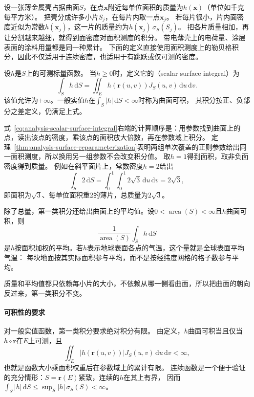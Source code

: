 设一张薄金属壳占据曲面$S$，在点$\bm x$附近每单位面积的质量为$h(\bm x)$（单位如千克每平方米）。
把壳分成许多小片$S_j$，在每片内取一点$\bm x_j$。
若每片很小，片内面密度近似为常数$h(\bm x_j)$，这一片的质量约为$h(\bm x_j)\,\sigma_S(S_j)$。
把各片质量相加，再让分割越来越细，就得到面密度对面积测度的积分。
带电薄壳上的电荷量、涂层表面的涂料用量都是同一种累计。
下面的定义直接使用面积测度上的勒贝格积分，因此不仅适用于连续密度，也适用于有跳跃或仅可测的密度。

\begin{definition}[第一类曲面积分]
\label{def:analysis-scalar-surface-integral}
设$h$是$S$上的可测标量函数。
当$h\geq0$时，定义它的（scalar surface integral）为
\begin{equation}
 \int_Sh\,\mathrm dS
 =\iint_Eh(\bm r(u,v))J_S(u,v)\,\mathrm du\,\mathrm dv.
 \label{eq:analysis-scalar-surface-integral}
\end{equation}
该值允许为$+\infty$。一般实值$h$在$\int_S|h|\,\mathrm dS<\infty$时称为曲面可积，
其积分按正、负部分之差定义，仍满足上式。
\end{definition}

式~\eqref{eq:analysis-scalar-surface-integral}右端的计算顺序是：用参数找到曲面上的点，读出该点的密度，乘该点的面积放大倍数，再在参数域上积分。
定理~\ref{thm:analysis-surface-reparameterization}表明两组单次覆盖的正则参数给出同一面积测度，所以换用另一组参数不会改变积分值。
取$h=1$得到面积，取非负面密度得到质量。
例如在斜平面片上，常数密度$h=2$给出
\[
 \int_S2\,\mathrm dS=\int_0^1\int_0^1 2\sqrt3\,\mathrm du\,\mathrm dv=2\sqrt3,
\]
即面积为$\sqrt3$、每单位面积重$2$的薄片，总质量为$2\sqrt3$。

除了总量，第一类积分还给出曲面上的平均值。设$0<\operatorname{area}(S)<\infty$且$h$曲面可积，则
\[
 \frac1{\operatorname{area}(S)}\int_Sh\,\mathrm dS
\]
是$h$按面积加权的平均。若$h$表示地球表面各点的气温，这个量就是全球表面平均气温：
每块地面按其实际面积参与平均，而不是按经纬度网格的格子数参与平均。

质量和平均值都只依赖每小片的大小，不依赖从哪一侧看曲面，所以把曲面的朝向反过来，第一类积分不变。

\paragraph{可积性的要求}

对一般实值函数，第一类积分要求绝对积分有限。
由定义，$h$曲面可积当且仅当$h\circ\bm r$在$E$上可测，且
\[
 \iint_E|h(\bm r(u,v))|J_S(u,v)\,\mathrm du\,\mathrm dv<\infty,
\]
也就是函数大小乘面积权重后在参数域上的累计有限。
连续函数是一个便于验证的充分情形：$S=\bm r(E)$紧致，连续的$h$在其上有界，
因而$\int_S|h|\,\mathrm dS\leq \sup_S|h|\,\sigma_S(S)<\infty$。

